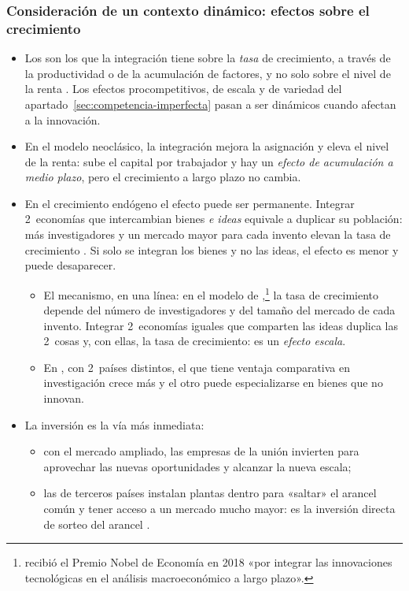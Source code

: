 \documentclass[11pt]{article}
\begin{document}
\subsubsection{Consideración de un contexto dinámico: efectos sobre el crecimiento}\label{sec:dinamicos}

\begin{itemize}
\item Los  son los que la integración tiene sobre la \emph{tasa} de crecimiento, a través de la productividad o de la acumulación de factores, y no solo sobre el nivel de la renta . Los efectos procompetitivos, de escala y de variedad del apartado~\ref{sec:competencia-imperfecta} pasan a ser dinámicos cuando afectan a la innovación.
\item En el modelo neoclásico, la integración mejora la asignación y eleva el nivel de la renta: sube el capital por trabajador y hay un \emph{efecto de acumulación a medio plazo}\nocite{Baldwin1989Growth}, pero el crecimiento a largo plazo no cambia.
\item En el crecimiento endógeno el efecto puede ser permanente. Integrar 2~economías que intercambian bienes \emph{e ideas} equivale a duplicar su población: más investigadores y un mercado mayor para cada invento elevan la tasa de crecimiento\nocite{RiveraBatizRomer1991} . Si solo se integran los bienes y no las ideas, el efecto es menor y puede desaparecer.
  \begin{itemize}
  \item El mecanismo, en una línea: en el modelo de \textcite{Romer1990Endogenous},\footnote{ recibió el Premio Nobel de Economía en 2018 «por integrar las innovaciones tecnológicas en el análisis macroeconómico a largo plazo»\nocite{Nobel2018Romer}.} la tasa de crecimiento depende del número de investigadores y del tamaño del mercado de cada invento. Integrar 2~economías iguales que comparten las ideas duplica las 2~cosas y, con ellas, la tasa de crecimiento: es un \emph{efecto escala}.
  \item En \textcite{GrossmanHelpman1991}, con 2~países distintos, el que tiene ventaja comparativa en investigación crece más y el otro puede especializarse en bienes que no innovan.
  \end{itemize}
\item La inversión es la vía más inmediata:
  \begin{itemize}
  \item con el mercado ampliado, las empresas de la unión invierten para aprovechar las nuevas oportunidades y alcanzar la nueva escala\nocite{Baldwin1989Growth};
  \item las de terceros países instalan plantas dentro para «saltar» el arancel común y tener acceso a un mercado mucho mayor: es la inversión directa de sorteo del arancel .
  \end{itemize}
\end{itemize}
\end{document}
